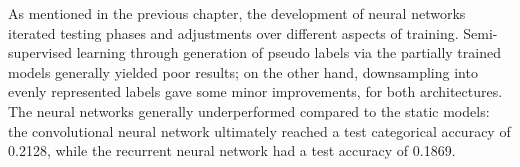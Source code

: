 
As mentioned in the previous chapter, the development of neural networks
iterated testing phases and adjustments over different aspects of training.
Semi-supervised learning through generation of pseudo labels via the partially
trained models generally yielded poor results; on the other hand, downsampling
into evenly represented labels gave some minor improvements, for both architectures.
The neural networks generally underperformed compared to the static models:
the convolutional neural network ultimately reached a test categorical accuracy
of 0.2128, while the recurrent neural network had a test accuracy of 0.1869. \\

